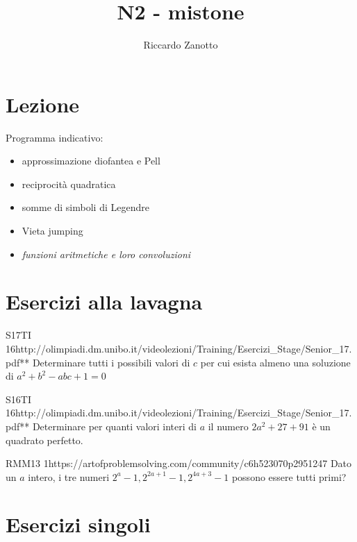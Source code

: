 \documentclass[12pt]{article}
\author{Riccardo Zanotto}
\title{N2 - mistone}
\begin{document}
\maketitle


\section{Lezione}

Programma indicativo:

\begin{itemize}
    \item approssimazione diofantea e Pell
    \item reciprocità quadratica
    \item somme di simboli di Legendre
    \item Vieta jumping
    \item \textit{funzioni aritmetiche e loro convoluzioni}
\end{itemize}

\section{Esercizi alla lavagna}

\begin{esercizio}{S17TI 16}{http://olimpiadi.dm.unibo.it/videolezioni/Training/Esercizi_Stage/Senior_17.pdf}{**}
    Determinare tutti i possibili valori di $c$ per cui esista almeno una soluzione di $a^2+b^2-abc+1=0$
\end{esercizio}

\begin{esercizio}{S16TI 16}{http://olimpiadi.dm.unibo.it/videolezioni/Training/Esercizi_Stage/Senior_17.pdf}{**}
    Determinare per quanti valori interi di $a$ il numero $2a^2+27+91$ è un quadrato perfetto.
\end{esercizio}

\begin{esercizio}{RMM13 1}{https://artofproblemsolving.com/community/c6h523070p2951247}
    Dato un $a$ intero, i tre numeri $2^a-1, 2^{2a+1}-1, 2^{4a+3}-1$ possono essere tutti primi?
\end{esercizio}

\section{Esercizi singoli}
\end{document}
